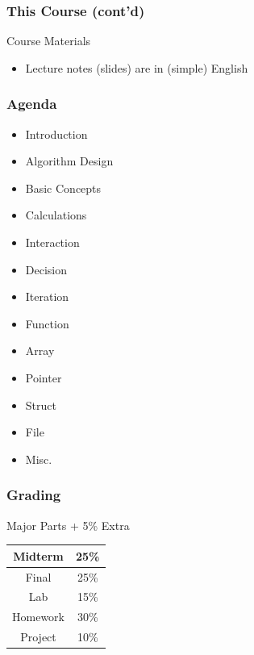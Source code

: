 \documentclass{../c-lecture}
\begin{document}
\begin{frame}
  \frametitle{This Course (cont'd)}
  Course Materials
  \begin{itemize}
    \item Lecture notes (slides) are in (simple) English
  \end{itemize}
\end{frame}
\begin{frame}[allowframebreaks]
  \frametitle{Agenda}
  \begin{itemize}
    \item Introduction
    \item Algorithm Design
    \item Basic Concepts
    \item Calculations
    \item Interaction
    \item Decision
    \item Iteration
    \item Function
    \item Array
    \item Pointer
    \item Struct
    \item File
    \item Misc.
  \end{itemize}
\end{frame}
\begin{frame}
  \frametitle{Grading}
  Major Parts + 5\% Extra
  \begin{table}
    \begin{tabular}{cc}
      \toprule

      Midterm &
      25\% \\

      \midrule

      Final &
      25\% \\

      \midrule

      Lab &
      15\% \\

      \midrule

      Homework &
      30\% \\

      \midrule

      Project &
      10\% \\

      \bottomrule
    \end{tabular}
  \end{table}
\end{frame}
\end{document}
